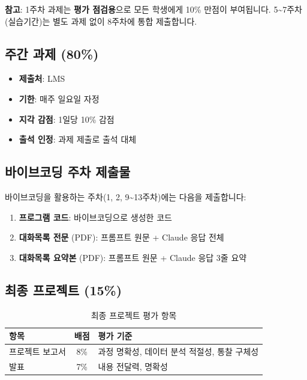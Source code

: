 \documentclass[11pt, a4paper]{article}
\begin{document}
\begin{info}
\textbf{참고}: 1주차 과제는 \textbf{평가 점검용}으로 모든 학생에게 10\% 만점이 부여됩니다. 5\textasciitilde7주차(실습기간)는 별도 과제 없이 8주차에 통합 제출합니다.
\end{info}

\subsection{주간 과제 (80\%)}

\begin{itemize}
    \item \textbf{제출처}: LMS
    \item \textbf{기한}: 매주 일요일 자정
    \item \textbf{지각 감점}: 1일당 10\% 감점
    \item \textbf{출석 인정}: 과제 제출로 출석 대체
\end{itemize}

\subsection{바이브코딩 주차 제출물}

바이브코딩을 활용하는 주차(1, 2, 9\textasciitilde13주차)에는 다음을 제출합니다:

\begin{enumerate}
    \item \textbf{프로그램 코드}: 바이브코딩으로 생성한 코드
    \item \textbf{대화목록 전문} (PDF): 프롬프트 원문 + Claude 응답 전체
    \item \textbf{대화목록 요약본} (PDF): 프롬프트 원문 + Claude 응답 3줄 요약
\end{enumerate}

\subsection{최종 프로젝트 (15\%)}

\begin{table}[H]
\centering
\begin{tabularx}{\textwidth}{l c X}
\toprule
\textbf{항목} & \textbf{배점} & \textbf{평가 기준} \\
\midrule
프로젝트 보고서 & 8\% & 과정 명확성, 데이터 분석 적절성, 통찰 구체성 \\
발표 & 7\% & 내용 전달력, 명확성 \\
\bottomrule
\end{tabularx}
\caption{최종 프로젝트 평가 항목}
\end{table}
\end{document}
